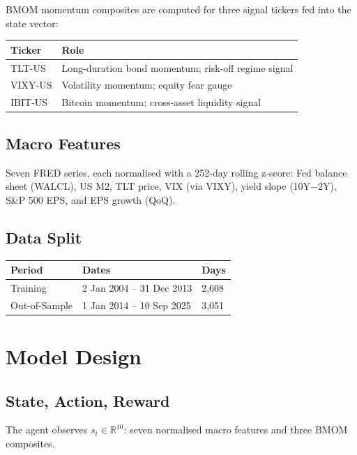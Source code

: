 \documentclass[11pt, a4paper]{article}
\begin{document}
BMOM momentum composites are computed for three signal tickers fed into the state vector:

\begin{center}
\begin{tabular}{ll}
\toprule
\textbf{Ticker} & \textbf{Role} \\
\midrule
TLT-US  & Long-duration bond momentum; risk-off regime signal \\
VIXY-US & Volatility momentum; equity fear gauge \\
IBIT-US & Bitcoin momentum; cross-asset liquidity signal \\
\bottomrule
\end{tabular}
\end{center}

\subsection{Macro Features}

Seven FRED series, each normalised with a 252-day rolling z-score: Fed balance sheet (WALCL), US M2, TLT price, VIX (via VIXY), yield slope (10Y$-$2Y), S\&P 500 EPS, and EPS growth (QoQ).

\subsection{Data Split}

\begin{center}
\begin{tabular}{lll}
\toprule
\textbf{Period} & \textbf{Dates} & \textbf{Days} \\
\midrule
Training        & 2 Jan 2004 -- 31 Dec 2013  & 2,608 \\
Out-of-Sample   & 1 Jan 2014 -- 10 Sep 2025  & 3,051 \\
\bottomrule
\end{tabular}
\end{center}

\section{Model Design}

\subsection{State, Action, Reward}

The agent observes $s_t \in \mathbb{R}^{10}$: seven normalised macro features and three BMOM composites.
\end{document}
